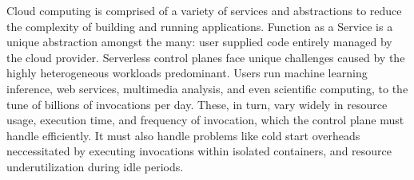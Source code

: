 Cloud computing is comprised of a variety of services and abstractions to reduce the complexity of building and running applications.
Function as a Service is a unique abstraction amongst the many: user supplied code entirely managed by the cloud provider.
Serverless control planes face unique challenges caused by the highly heterogeneous workloads predominant.
Users run machine learning inference, web services, multimedia analysis, and even scientific computing, to the tune of billions of invocations per day.
These, in turn, vary widely in resource usage, execution time, and frequency of invocation, which the control plane must handle efficiently.
It must also handle problems like cold start overheads neccessitated by executing invocations within isolated containers, and resource underutilization during idle periods.

